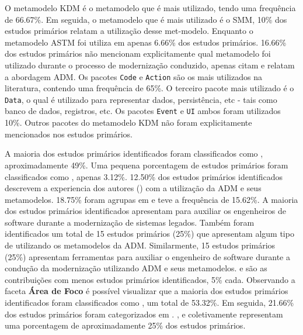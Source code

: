 O metamodelo KDM é o metamodelo que é mais utilizado, tendo uma frequência de 66.67\%. Em seguida, o metamodelo que é mais utilizado é o SMM, 10\% dos estudos primários relatam a utilização desse met-modelo. Enquanto o metamodelo ASTM foi utiliza em apenas 6.66\% dos estudos primários. 16.66\% dos estudos primários não mencionam explicitamente qual metamodelo foi utilizado durante o processo de modernização conduzido, apenas citam e relatam a abordagem ADM. Os pacotes \texttt{Code} e \texttt{Action} são os mais utilizados na literatura, contendo uma frequência de 65\%. O terceiro pacote mais utilizado é o \texttt{Data}, o qual é utilizado para representar dados, persistência, etc - tais como banco de dados, registros, etc. Os pacotes \texttt{Event} e \texttt{UI} ambos foram utilizados 10\%. Outros pacotes do metamodelo KDM não foram explicitamente mencionados nos estudos primários.

A maioria dos estudos primários identificados foram classificados como , aproximadamente 49\%. Uma pequena porcentagem de estudos primários foram classificados como , apenas 3.12\%. 12.50\% dos estudos primários identificados descrevem a experiencia dos autores () com a utilização da ADM e seus metamodelos. 18.75\% foram agrupas em  e  teve a frequência de 15.62\%. A maioria dos estudos primários identificados apresentam  para auxiliar os engenheiros de software durante a modernização de sistemas legados. Também foram identificados um total de 15 estudos primários (25\%) que apresentam algum tipo de  utilizando os metamodelos da ADM. Similarmente, 15 estudos primários (25\%) apresentam ferramentas para auxiliar o engenheiro de software durante a condução da modernização utilizando ADM e seus metamodelos.  e  são as contribuições com menos estudos primários identificados, 5\% cada. Observando a faceta \textbf{Área de Foco} é possível visualizar que a maioria dos estudos primários identificados foram classificados como , um total de 53.32\%. Em seguida, 21.66\% dos estudos primários foram categorizados em . ,  e  coletivamente representam uma porcentagem de aproximadamente 25\% dos estudos primários.


